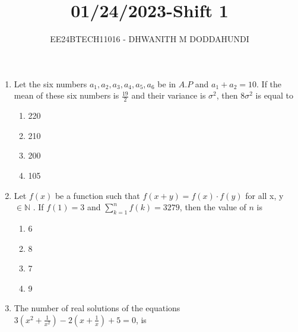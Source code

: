 \documentclass[journal]{IEEEtran}
\begin{document}

\vspace{3cm}

\title{01/24/2023-Shift 1}
\author{EE24BTECH11016 - DHWANITH M DODDAHUNDI}

{\let\newpage\relax\maketitle}

\renewcommand{\thefigure}{\theenumi}
\renewcommand{\thetable}{\theenumi}
\setlength{\intextsep}{10pt} %

\begin{enumerate}
\setcounter{enumi}{0}
    \item Let the six numbers $a_{1},a_{2},a_{3},a_{4},a_{5},a_{6}$ be in $A.P$ and $a_{1}+a_{2}=10$. If the mean of these six numbers is $ \frac{19}{2} $ and their variance is $\sigma^{2}$, then 8$\sigma^{2}$ is equal to 
    \begin{enumerate}
        \item 220
        \item 210
        \item 200
        \item 105
    \end{enumerate}
    \item Let $f(x)$ be a function such that $f(x+y)=f(x)\cdot f(y)$ for all x, y $\in \mathbb{N}$ . If  $ f(1)=3 $  and  $ \sum_{k=1}^{n} f(k)= 3279$, then the value of $n$ is
    \begin{enumerate}
        \item 6
        \item 8
        \item 7
        \item 9
    \end{enumerate} 
    \item The number of real solutions of the equations $3\left( x^{2}+\frac{1}{x^{2}} \right)-2\left( x+\frac{1}{x} \right)+5=0$, is
    \begin{enumerate}
        

\end{enumerate}
\end{enumerate}
\end{document}
